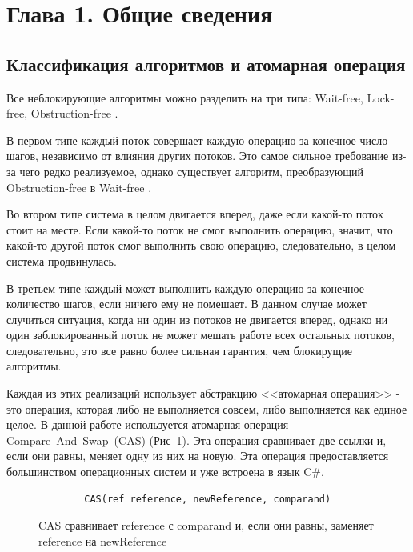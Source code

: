 \documentclass[12pt]{article}
\begin{document}
{		\newpage
		
		\section{Глава 1. Общие сведения}
			\subsection{Классификация алгоритмов и атомарная операция}
				\par Все неблокирующие алгоритмы можно разделить на три типа: Wait-free, Lock-free, Obstruction-free \cite{WaitFree}.
				\par В первом типе каждый поток совершает каждую операцию за конечное число шагов, независимо от влияния других потоков. Это самое сильное требование из-за чего редко реализуемое, однако существует алгоритм, преобразующий Obstruction-free в Wait-free \cite{waitFree2}.
				\par Во втором типе система в целом двигается вперед, даже если какой-то поток стоит на месте. Если какой-то поток не смог выполнить операцию, значит, что какой-то другой поток смог выполнить свою операцию, следовательно, в целом система продвинулась.
				\par В третьем типе каждый может выполнить каждую операцию за конечное количество шагов, если ничего ему не помешает. В данном случае может случиться ситуация, когда ни один из потоков не двигается вперед, однако ни один заблокированный поток не может мешать работе всех остальных потоков, следовательно, это все равно более сильная гарантия, чем блокирущие алгоритмы.
				\par Каждая из этих реализаций использует абстракцию <<атомарная операция>> - это операция, которая либо не выполняется совсем, либо выполняется как единое целое. В данной работе используется атомарная операция Compare~And~Swap~(CAS) (Рис~\ref{pic:CAS}). Эта операция сравнивает две ссылки и, если они равны, меняет одну из них на новую. Эта операция предоставляется большинством операционных систем и уже встроена в язык C\#.
				\begin{figure}[h]
					\begin{lstlisting}
		CAS(ref reference, newReference, comparand)
					\end{lstlisting}
					\caption{CAS сравнивает reference с comparand и, если они равны, заменяет reference на newReference}
					\label{pic:CAS}
				\end{figure}
}
\end{document}
